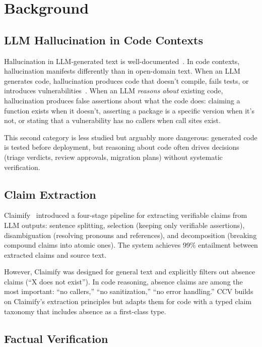 \section{Background}
\label{sec:background}

\subsection{LLM Hallucination in Code Contexts}

Hallucination in LLM-generated text is well-documented~\cite{ji2023hallucination, zhang2023siren}. In code contexts, hallucination manifests differently than in open-domain text. When an LLM generates code, hallucination produces code that doesn't compile, fails tests, or introduces vulnerabilities~\cite{chen2021codex, pearce2022security}. When an LLM \emph{reasons about} existing code, hallucination produces false assertions about what the code does: claiming a function exists when it doesn't, asserting a package is a specific version when it's not, or stating that a vulnerability has no callers when call sites exist.

This second category is less studied but arguably more dangerous: generated code is tested before deployment, but reasoning about code often drives decisions (triage verdicts, review approvals, migration plans) without systematic verification.

\subsection{Claim Extraction}

Claimify~\cite{metropolitansky2025claimify} introduced a four-stage pipeline for extracting verifiable claims from LLM outputs: sentence splitting, selection (keeping only verifiable assertions), disambiguation (resolving pronouns and references), and decomposition (breaking compound claims into atomic ones). The system achieves 99\% entailment between extracted claims and source text.

However, Claimify was designed for general text and explicitly filters out absence claims (``X does not exist''). In code reasoning, absence claims are among the most important: ``no callers,'' ``no sanitization,'' ``no error handling.'' CCV builds on Claimify's extraction principles but adapts them for code with a typed claim taxonomy that includes absence as a first-class type.

\subsection{Factual Verification}

